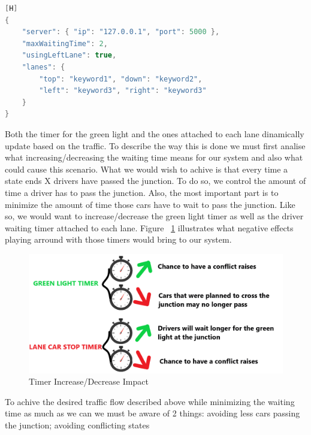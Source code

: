 \documentclass[17pt]{report}
\begin{document}
\begin{lstlisting}[language = C++][H]
{ 
    "server": { "ip": "127.0.0.1", "port": 5000 },
    "maxWaitingTime": 2,
    "usingLeftLane": true,
    "lanes": { 
        "top": "keyword1", "down": "keyword2",
        "left": "keyword3", "right": "keyword3"
    } 
}
\end{lstlisting}

Both the timer for the green light and the ones attached to each lane 
dinamically update based on the traffic. To describe the way this is 
done we must first analise what increasing/decreasing the waiting time 
means for our system and also what could cause this scenario. 
What we would wish to achive is that every time a state ends X
drivers have passed the junction. To do so, we control the amount of 
time a driver has to pass the junction. Also, the most important part 
is to minimize the amount of time those cars have to wait to pass the 
junction. Like so, we would want to increase/decrease the green light 
timer as well as the driver waiting timer attached to each lane. 
Figure ~\ref{fig:Timer Increase/Decrease Impact} illustrates
what negative effects playing arround with those timers would bring
to our system.

\begin{figure}[h!]
    \includegraphics[width=\textwidth]{Sketches/TimerIncreaseDecreaseImpact.png}
    \caption{Timer Increase/Decrease Impact}
    \label{fig:Timer Increase/Decrease Impact}
\end{figure}

To achive the desired traffic flow described above while minimizing
the waiting time as much as we can we must be aware of 2 things:
avoiding less cars passing the junction; avoiding conflicting states
\end{document}
